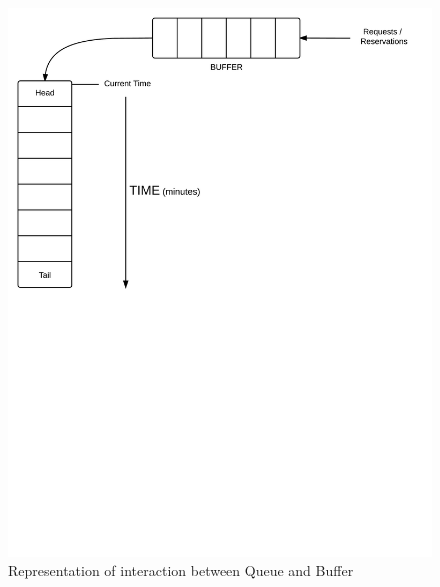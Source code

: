 \begin{figure}[htbp]
\centering
\includegraphics[width=\textwidth]{cpt/img/BufferQueue}
\caption{Representation of interaction between Queue and Buffer}
\label{fig:buff}
\end{figure}
\clearpage

